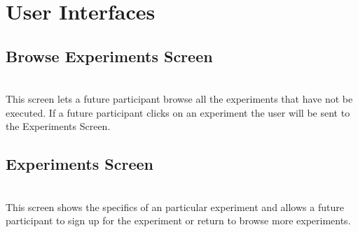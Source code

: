 \setlength\fboxsep{0pt}
\setlength\fboxrule{0.5pt}

\section{User Interfaces}
\subsection{Browse Experiments Screen}
\\
This screen lets a future participant browse all the experiments that have not be executed.  If a future participant clicks on an experiment the user will be sent to the Experiments Screen.

\subsection{Experiments Screen}
\\
This screen shows the specifics of an particular experiment and allows a future participant to sign up for the experiment or return to browse more experiments.

